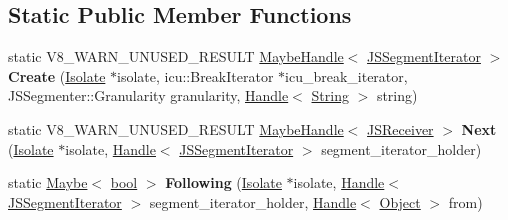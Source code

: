 \subsection*{Static Public Member Functions}
\begin{DoxyCompactItemize}
\item 
\mbox{\label{classv8_1_1internal_1_1JSSegmentIterator_ac57c599a6b540277222e1e67ae06dfc5}} 
static V8\+\_\+\+W\+A\+R\+N\+\_\+\+U\+N\+U\+S\+E\+D\+\_\+\+R\+E\+S\+U\+LT \mbox{\hyperlink{classv8_1_1internal_1_1MaybeHandle}{Maybe\+Handle}}$<$ \mbox{\hyperlink{classv8_1_1internal_1_1JSSegmentIterator}{J\+S\+Segment\+Iterator}} $>$ {\bfseries Create} (\mbox{\hyperlink{classv8_1_1internal_1_1Isolate}{Isolate}} $\ast$isolate, icu\+::\+Break\+Iterator $\ast$icu\+\_\+break\+\_\+iterator, J\+S\+Segmenter\+::\+Granularity granularity, \mbox{\hyperlink{classv8_1_1internal_1_1Handle}{Handle}}$<$ \mbox{\hyperlink{classv8_1_1internal_1_1String}{String}} $>$ string)
\item 
\mbox{\label{classv8_1_1internal_1_1JSSegmentIterator_a012f6a2066b43f4bf6f06ecb949d624f}} 
static V8\+\_\+\+W\+A\+R\+N\+\_\+\+U\+N\+U\+S\+E\+D\+\_\+\+R\+E\+S\+U\+LT \mbox{\hyperlink{classv8_1_1internal_1_1MaybeHandle}{Maybe\+Handle}}$<$ \mbox{\hyperlink{classv8_1_1internal_1_1JSReceiver}{J\+S\+Receiver}} $>$ {\bfseries Next} (\mbox{\hyperlink{classv8_1_1internal_1_1Isolate}{Isolate}} $\ast$isolate, \mbox{\hyperlink{classv8_1_1internal_1_1Handle}{Handle}}$<$ \mbox{\hyperlink{classv8_1_1internal_1_1JSSegmentIterator}{J\+S\+Segment\+Iterator}} $>$ segment\+\_\+iterator\+\_\+holder)
\item 
\mbox{\label{classv8_1_1internal_1_1JSSegmentIterator_af1b7dcad61734a6513e9c115012271b5}} 
static \mbox{\hyperlink{classv8_1_1Maybe}{Maybe}}$<$ \mbox{\hyperlink{classbool}{bool}} $>$ {\bfseries Following} (\mbox{\hyperlink{classv8_1_1internal_1_1Isolate}{Isolate}} $\ast$isolate, \mbox{\hyperlink{classv8_1_1internal_1_1Handle}{Handle}}$<$ \mbox{\hyperlink{classv8_1_1internal_1_1JSSegmentIterator}{J\+S\+Segment\+Iterator}} $>$ segment\+\_\+iterator\+\_\+holder, \mbox{\hyperlink{classv8_1_1internal_1_1Handle}{Handle}}$<$ \mbox{\hyperlink{classv8_1_1internal_1_1Object}{Object}} $>$ from)
\item 
\mbox{\label{classv8_1_1internal_1_1JSSegmentIterator_aba6af3a22d645a40d508ad4ca9690b86}} 

\end{DoxyCompactItemize}

